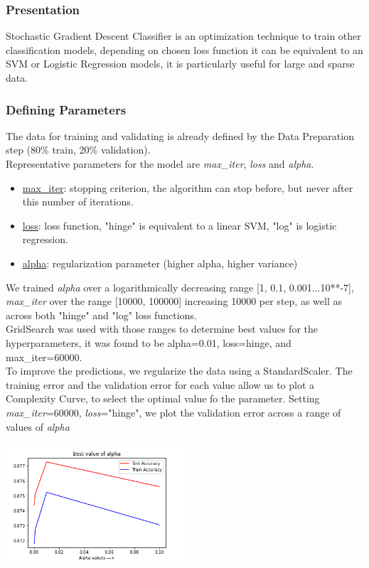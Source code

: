 \subsubsection{Presentation}
Stochastic Gradient Descent Classifier is an optimization technique to train other classification models, depending on chosen loss function it can be equivalent to an SVM or Logistic Regression models, it is particularly useful for large and sparse data.

\subsubsection{Defining Parameters}
The data for training and validating is already defined by the Data Preparation step (80\% train, 20\% validation).\\
Representative parameters for the model are \emph{max\_iter}, \emph{loss} and \emph{alpha}.
\begin{itemize}
    \item \underline{max\_iter}: stopping criterion, the algorithm can stop before, but never after this number of iterations.
    \item \underline{loss}: loss function, "hinge" is equivalent to a linear SVM, "log" is logistic regression.
    \item \underline{alpha}: regularization parameter (higher alpha, higher variance)
\end{itemize}
We trained \emph{alpha} over a logarithmically decreasing range [1, 0.1, 0.001...10**-7], \emph{max\_iter} over the range [10000, 100000] increasing 10000 per step, as well as across both "hinge" and "log" loss functions.\\
GridSearch was used with those ranges to determine best values for the hyperparameters, it was found to be alpha=0.01, loss=hinge, and  max\_iter=60000. \\
To improve the predictions, we regularize the data using a StandardScaler.
The training error and the validation error for each value allow us to plot a Complexity Curve, to select the optimal value fo the parameter.
Setting \emph{max\_iter}=60000, \emph{loss}="hinge", we plot the validation error across a range of values of \emph{alpha}
\begin{center}
    \captionsetup{type=figure}
    \includegraphics[width=250px]{SGD_complexity.png}
\end{center}

